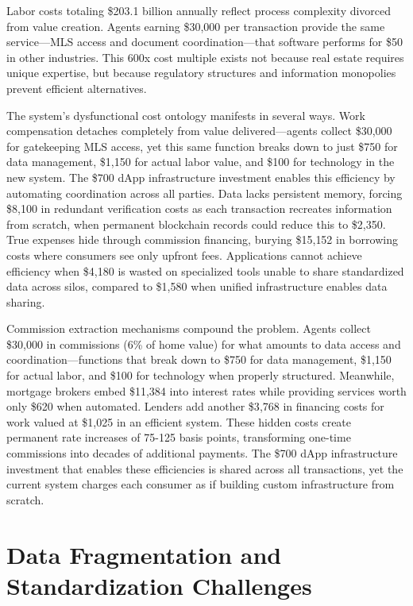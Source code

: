 Labor costs totaling \$203.1 billion annually reflect process complexity divorced from value creation. Agents earning \$30{,}000 per transaction provide the same service—MLS access and document coordination—that software performs for \$50 in other industries. This 600x cost multiple exists not because real estate requires unique expertise, but because regulatory structures and information monopolies prevent efficient alternatives.

The system's dysfunctional cost ontology manifests in several ways. Work compensation detaches completely from value delivered—agents collect \$30{,}000 for gatekeeping MLS access, yet this same function breaks down to just \$750 for data management, \$1{,}150 for actual labor value, and \$100 for technology in the new system. The \$700 dApp infrastructure investment enables this efficiency by automating coordination across all parties. Data lacks persistent memory, forcing \$8{,}100 in redundant verification costs as each transaction recreates information from scratch, when permanent blockchain records could reduce this to \$2{,}350. True expenses hide through commission financing, burying \$15{,}152 in borrowing costs where consumers see only upfront fees. Applications cannot achieve efficiency when \$4{,}180 is wasted on specialized tools unable to share standardized data across silos, compared to \$1{,}580 when unified infrastructure enables data sharing.

Commission extraction mechanisms compound the problem. Agents collect \$30{,}000 in commissions (6\% of home value) for what amounts to data access and coordination—functions that break down to \$750 for data management, \$1{,}150 for actual labor, and \$100 for technology when properly structured. Meanwhile, mortgage brokers embed \$11{,}384 into interest rates while providing services worth only \$620 when automated. Lenders add another \$3{,}768 in financing costs for work valued at \$1{,}025 in an efficient system. These hidden costs create permanent rate increases of 75-125 basis points, transforming one-time commissions into decades of additional payments. The \$700 dApp infrastructure investment that enables these efficiencies is shared across all transactions, yet the current system charges each consumer as if building custom infrastructure from scratch.

\section{Data Fragmentation and Standardization Challenges}

